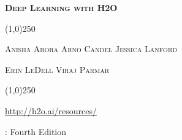 




\usepackage{bibentry}





\thispagestyle{empty} %


\begin{center}
\textsc{\Large\bf{Deep Learning with H2O}}
\bigskip

\line(1,0){250}  %



\bigskip

\textsc{\small{Anisha Arora \hspace{10pt} Arno Candel \hspace{10pt} Jessica Lanford}}

\textsc{\small{Erin LeDell \hspace{10pt} Viraj Parmar}}


\line(1,0){250}  %

{\url{http://h2o.ai/resources/}}

\normalsize
\bigskip
\monthname \hspace{1pt}  \the\year: Fourth Edition 

\bigskip
\end{center}


